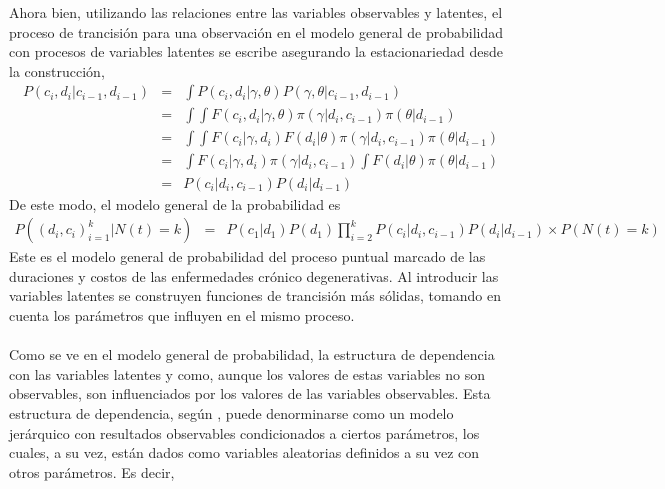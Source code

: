 Ahora bien, utilizando las relaciones entre las variables observables y latentes, el proceso de trancisi\'on para una observaci\'on en el modelo general de probabilidad con procesos de variables latentes se escribe asegurando la estacionariedad desde la construcci\'on,
\begin{eqnarray*}
P(c_i,d_i|c_{i-1},d_{i-1}) &=&\int P(c_i,d_i|\gamma,\theta)P(\gamma,\theta|c_{i-1},d_{i-1})\\
&=&\int \int F(c_i,d_i|\gamma,\theta)\pi(\gamma|d_i,c_{i-1})\pi(\theta|d_{i-1})\\
&=&\int \int F(c_i|\gamma,d_i) F(d_i|\theta)\pi(\gamma|d_i,c_{i-1})\pi(\theta|d_{i-1})\\
&=&\int F(c_i|\gamma,d_i)\pi(\gamma|d_i,c_{i-1}) \int F(d_i|\theta)\pi(\theta|d_{i-1})\\
&=&P(c_i|d_i,c_{i-1})P(d_i|d_{i-1})
\end{eqnarray*}
De este modo, el modelo general de la probabilidad es
\begin{eqnarray*}
P((d_i,c_i)_{i=1}^k|N(t)=k)&=& P(c_1|d_1)P(d_1) \prod_{i=2}^k P(c_i|d_i,c_{i-1})P(d_i|d_{i-1}) \times P(N(t)=k)%
\end{eqnarray*}
Este es el modelo general de probabilidad del proceso puntual marcado de las duraciones y costos de las enfermedades cr\'onico degenerativas. Al introducir las variables latentes se construyen funciones de trancisi\'on m\'as s\'olidas, tomando en cuenta los par\'ametros que influyen en el mismo proceso.\\
\\
Como se ve en el modelo general de probabilidad, la estructura de dependencia con las variables latentes y como, aunque los valores de estas variables no son observables, son influenciados por los valores de las variables observables. Esta estructura de dependencia, seg\'un \cite{gelman2014bayesian}, puede denorminarse como un modelo jer\'arquico con resultados observables condicionados a ciertos par\'ametros, los cuales, a su vez, est\'an dados como variables aleatorias definidos a su vez con otros par\'ametros. Es decir,\\
